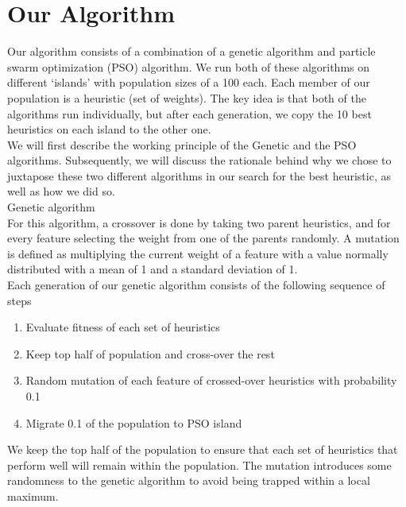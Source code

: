 \documentclass{article}
\begin{document}
    \section{Our Algorithm}

    Our algorithm consists of a combination of a genetic algorithm and particle swarm
	optimization (PSO) algorithm. We run both of these algorithms on different ‘islands’
	with population sizes of a 100 each. Each member of our population is a heuristic (set of weights).
	The key idea is that both of the algorithms run individually, but after each generation, we
	copy the 10 best heuristics on each island to the other one.\\
	\newline
	We will first describe the working principle
	of the Genetic and the PSO algorithms. Subsequently, we will
	discuss the rationale behind why we chose to juxtapose these two different
	algorithms in our search for the best heuristic, as well as how we did so.\\

	Genetic algorithm\\
	For this algorithm, a crossover is done by taking two parent heuristics, and
	for every feature selecting the weight from one of the parents randomly. A
	mutation is defined as multiplying the current weight of a feature with
	a value normally distributed with a mean of 1 and a standard deviation of 1.\\
	Each generation of our genetic algorithm consists of the following sequence of steps
	\begin{enumerate}
		\item Evaluate fitness of each set of heuristics
		\item Keep top half of population and cross-over the rest
		\item Random mutation of each feature of crossed-over heuristics with
		probability 0.1
		\item Migrate 0.1 of the population to PSO island
	\end{enumerate}
	We keep the top half of the population to ensure that each set of heuristics
	that perform well will remain within the population. The mutation introduces
	some randomness to the genetic algorithm to avoid being trapped within a local
	maximum.\\
\end{document}
